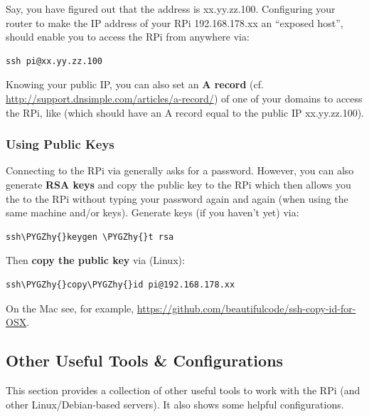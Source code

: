 \documentclass[letterpaper,10pt,english]{sphinxmanual}
\def\PYGZhy{\char`\-}
\begin{document}
Say, you have figured out that the address is xx.yy.zz.100. Configuring your router to make the IP address of your RPi 192.168.178.xx an ``exposed host'', should enable you to access the RPi from anywhere via:

\begin{Verbatim}[commandchars=\\\{\}]
ssh pi@xx.yy.zz.100
\end{Verbatim}

Knowing your public IP, you can also set an \textbf{A record} (cf. \href{http://support.dnsimple.com/articles/a-record/}{http://support.dnsimple.com/articles/a-record/}) of one of your domains to access the RPi, like  (which should have an A record equal to the public IP xx.yy.zz.100).


\subsubsection{Using Public Keys}
\label{00_basic_config:using-public-keys}
Connecting to the RPi via  generally asks for a password. However, you can also generate \textbf{RSA keys} and copy the public key to the RPi which then allows you the  to the RPi without typing your password again and again (when using the same machine and/or keys). Generate keys (if you haven't yet) via:

\begin{Verbatim}[commandchars=\\\{\}]
ssh\PYGZhy{}keygen \PYGZhy{}t rsa
\end{Verbatim}

Then \textbf{copy the public key} via (Linux):

\begin{Verbatim}[commandchars=\\\{\}]
ssh\PYGZhy{}copy\PYGZhy{}id pi@192.168.178.xx
\end{Verbatim}

On the Mac see, for example, \href{https://github.com/beautifulcode/ssh-copy-id-for-OSX}{https://github.com/beautifulcode/ssh-copy-id-for-OSX}.


\subsection{Other Useful Tools \& Configurations}
\label{00_basic_config:other-useful-tools-configurations}
This section provides a collection of other useful tools to work with the RPi (and other Linux/Debian-based servers). It also shows some helpful configurations.
\end{document}
